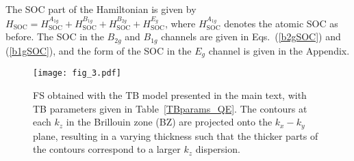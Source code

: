 \documentclass[%
reprint,
superscriptaddress,
 amsmath,amssymb,
 aps,
prb,
nobalancelastpage,
]{revtex4-2}
\begin{document}
The SOC part of the Hamiltonian is given by $\displaystyle H_{\text{SOC}} = H_{\text{SOC}}^{A_{1g}} + H_{\text{SOC}}^{B_{1g}} + H_{\text{SOC}}^{B_{2g}} + H_{\text{SOC}}^{E_{g}}$, where $H_{\text{SOC}}^{A_{1g}}$ denotes the atomic SOC as before. The SOC in the $B_{2g}$ and $B_{1g}$ channels are given in Eqs.~(\ref{b2gSOC}) and (\ref{b1gSOC}), and the form of the SOC in the $E_{g}$ channel is given in the Appendix. 



\begin{figure}[t!]
\texttt{[image: fig\_3.pdf]}%
\caption{\label{fig3}FS obtained with the TB model presented in the main text, with TB parameters given in Table~\ref{TBparams_QE}. The contours at each $k_{z}$ in the Brillouin zone (BZ) are projected onto the $k_{x}-k_{y}$ plane, resulting in a varying thickness such that the thicker parts of the contours correspond to a larger $k_{z}$ dispersion.}
\end{figure}
\end{document}
